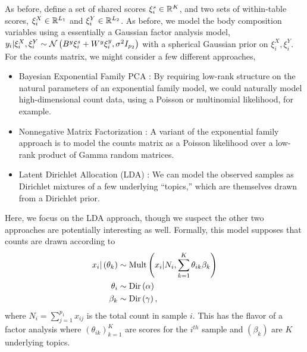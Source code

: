 \documentclass{article}
\begin{document}
As before, define a set of shared scores $\xi_{i}^{s} \in \mathbb{R}^{K}$, and two
sets of within-table scores, $\xi_{i}^{X} \in \mathbb{R}^{L_{1}}$ and $\xi_{i}^{Y}
\in \mathbb{R}^{L_{2}}$. As before, we model the body composition variables using a
essentially a Gaussian factor analysis model, $y_{i} \vert \xi_{i}^{X},
\xi_{i}^{Y} \sim \mathcal{N}\left(B^{y}\xi_{i}^s + W^y \xi_{i}^y,
\sigma^{2}I_{p_{2}}\right)$ with a spherical Gaussian prior on $\xi_{i}^{X},
\xi_{i}^{Y}$. For the counts matrix, we might consider a few different
approaches,

\begin{itemize}
\item Bayesian Exponential Family PCA \citep{mohamed2009bayesian}: By requiring
  low-rank structure on the natural parameters of an exponential family model,
  we could naturally model high-dimensional count data, using a Poisson or
  multinomial likelihood, for example.
\item Nonnegative Matrix Factorization \citep{lee2001algorithms}: A variant of
  the exponential family approach is to model the counts matrix as a Poisson
  likelihood over a low-rank product of Gamma random matrices.
\item Latent Dirichlet Allocation (LDA) \citep{blei2003latent}: We can model the
  observed samples as Dirichlet mixtures of a few underlying ``topics,'' which
  are themselves drawn from a Dirichlet prior.
\end{itemize}

Here, we focus on the LDA approach, though we suspect the other two approaches
are potentially interesting as well. Formally, this model supposes that counts
are drawn according to
\begin{align*}
  x_{i} \vert \left(\theta_{k}\right) &\sim \textnormal{Mult}\left(x_{i} \vert N_{i},
  \sum_{k = 1}^{K} \theta_{ik} \beta_{k}\right) \\
  \theta_{i} &\sim \textnormal{Dir}\left(\alpha\right)\\
  \beta_k &\sim \textnormal{Dir}\left(\gamma\right),
\end{align*}
where $N_i = \sum_{j = 1}^{p_1} x_{ij}$ is the total count in sample $i$. This
has the flavor of a factor analysis where $\left(\theta_{ik}\right)_{k =1}^{K}$
are scores for the $i^{th}$ sample and $\left(\beta_{k}\right)$ are $K$
underlying topics.
\end{document}
